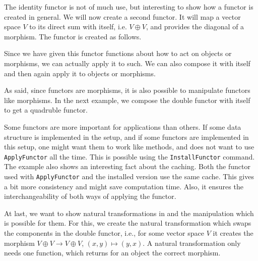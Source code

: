 \begin{small}

\end{small}

The identity functor is not of much use, but interesting to show how a functor is created in general. We will now create a second functor. It will
map a vector space $V$ to its direct sum with itself, i.e. $V \oplus V$, and provides the diagonal of a morphism. The functor is created as follows.



Since we have given this functor functions about how to act on objects or morphisms, we can actually apply it to such. We can also compose it with itself
and then again apply it to objects or morphisms.

\begin{small}

\end{small}

As said, since functors are morphisms, it is also possible to manipulate functors like morphisms. In the next example, we compose the double functor with itself
to get a quadruble functor.

\begin{small}

\end{small}

Some functors are more important for applications than others. If some data structure is implemented in the \CapPkg setup, and if some functors are implemented
in this setup, one might want them to work like methods, and does not want to use \texttt{ApplyFunctor} all the time. This is possible using the \texttt{InstallFunctor}
command. The example also shows an interesting fact about the caching. Both the functor used with \texttt{ApplyFunctor} and the installed version use the same cache. This
gives a bit more consistency and might save computation time. Also, it ensures the interchangeability of both ways of applying the functor.

\begin{small}

\end{small}

At last, we want to show natural transformations in \CapPkg and the manipulation which is possible for them. For this, we create the natural transformation which
swaps the components in the double functor, i.e., for some vector space $V$ it creates the morphism $V \oplus V \rightarrow V \oplus V$, $\left( x,y \right) \mapsto \left( y,x \right)$.
A natural transformation only needs one function, which returns for an object the correct morphism.

